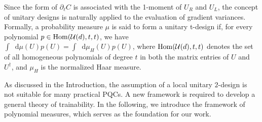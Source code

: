 \documentclass[%
 superscriptaddress,
 aps,prl,
 reprint,
 twocolumn,
 amsmath,amssymb,showpacs,
 bibnotes,
]{revtex4-2}
\newcommand*{\dif}{\mathop{}\!\mathrm{d}}
\begin{document}
Since the form of $\partial_\ell C$ is associated with the 1-moment of $U_R$ and $U_L$, the concept of unitary designs is naturally applied to the evaluation of gradient variances. Formally, a probability measure $\mu$ is said to form a unitary t-design\cite{gross2007evenly, dankert2009exact} if, for every polynomial $p\in {\rm Hom}(\mathcal{U}(d), t, t)$, we have $\int \dif \mu(U) p(U) = \int \dif\mu_H(U)p(U)$, where ${\rm Hom}(\mathcal{U}(d), t, t)$ denotes the set of all homogeneous polynomials of degree $t$ in both the matrix entries of $U$ and $U^\dagger$, and $\mu_H$ is the normalized Haar measure. 

As discussed in the Introduction, the assumption of a local unitary $2$-design is not suitable for many practical PQCs. A new framework is required to develop a general theory of trainability. In the following, we introduce the framework of polynomial measures, which serves as the foundation for our work.
\end{document}
